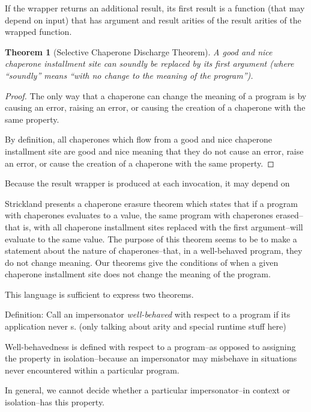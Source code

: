 \documentclass{sigplanconf}
\newtheorem{theorem}{Theorem}
\begin{document}
If the wrapper returns an additional result, its first result is a function (that may depend on input) that has argument and result arities of the result arities of the wrapped function.

\begin{theorem}[Selective Chaperone Discharge Theorem]
A good and nice chaperone installment site can soundly be replaced by its first argument (where ``soundly'' means ``with no change to the meaning of the program'').
\end{theorem}

\begin{proof}
The only way that a chaperone can change the meaning of a program is by causing an error, raising an error, or causing the creation of a chaperone with the same property.

By definition, all chaperones which flow from a good and nice chaperone installment site are good and nice meaning that they do not cause an error, raise an error, or cause the creation of a chaperone with the same property.
\end{proof}


Because the result wrapper is produced at each invocation, it may depend on 

Strickland presents a chaperone erasure theorem which states that if a program with chaperones evaluates to a value, the same program with chaperones erased--that is, with all chaperone installment sites replaced with the first argument--will evaluate to the same value. The purpose of this theorem seems to be to make a statement about the nature of chaperones--that, in a well-behaved program, they do not change meaning. Our theorems give the conditions of when a given chaperone installment site does not change the meaning of the program.

This language is sufficient to express two theorems.

Definition: Call an impersonator \emph{well-behaved} with respect to a program if its application never s.
(only talking about arity and special runtime stuff here)

Well-behavedness is defined with respect to a program--as opposed to assigning the property in isolation--because an impersonator may misbehave in situations never encountered within a particular program.

In general, we cannot decide whether a particular impersonator--in context or isolation--has this property.
\end{document}
